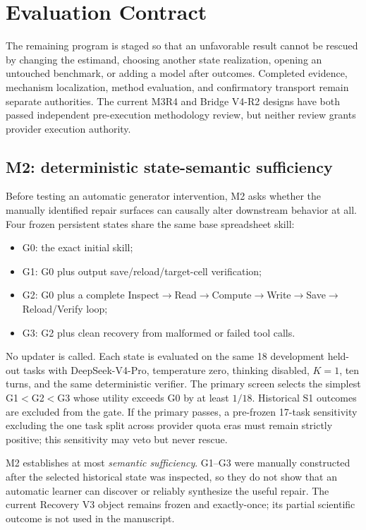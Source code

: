 \section{Evaluation Contract}
\label{sec:evaluation}

The remaining program is staged so that an unfavorable result cannot be rescued by changing the estimand, choosing another state realization, opening an untouched benchmark, or adding a model after outcomes. Completed evidence, mechanism localization, method evaluation, and confirmatory transport remain separate authorities. The current M3R4 and Bridge V4-R2 designs have both passed independent pre-execution methodology review, but neither review grants provider execution authority.

\subsection{M2: deterministic state-semantic sufficiency}
Before testing an automatic generator intervention, M2 asks whether the manually identified repair surfaces can causally alter downstream behavior at all. Four frozen persistent states share the same base spreadsheet skill:
\begin{itemize}
    \item G0: the exact initial skill;
    \item G1: G0 plus output save/reload/target-cell verification;
    \item G2: G0 plus a complete Inspect$\rightarrow$Read$\rightarrow$Compute$\rightarrow$Write$\rightarrow$Save$\rightarrow$Reload/Verify loop;
    \item G3: G2 plus clean recovery from malformed or failed tool calls.
\end{itemize}
No updater is called. Each state is evaluated on the same 18 development held-out tasks with DeepSeek-V4-Pro, temperature zero, thinking disabled, $K=1$, ten turns, and the same deterministic verifier. The primary screen selects the simplest G1$<$G2$<$G3 whose utility exceeds G0 by at least $1/18$. Historical S1 outcomes are excluded from the gate. If the primary passes, a pre-frozen 17-task sensitivity excluding the one task split across provider quota eras must remain strictly positive; this sensitivity may veto but never rescue.

M2 establishes at most \emph{semantic sufficiency}. G1--G3 were manually constructed after the selected historical state was inspected, so they do not show that an automatic learner can discover or reliably synthesize the useful repair. The current Recovery V3 object remains frozen and exactly-once; its partial scientific outcome is not used in the manuscript.

